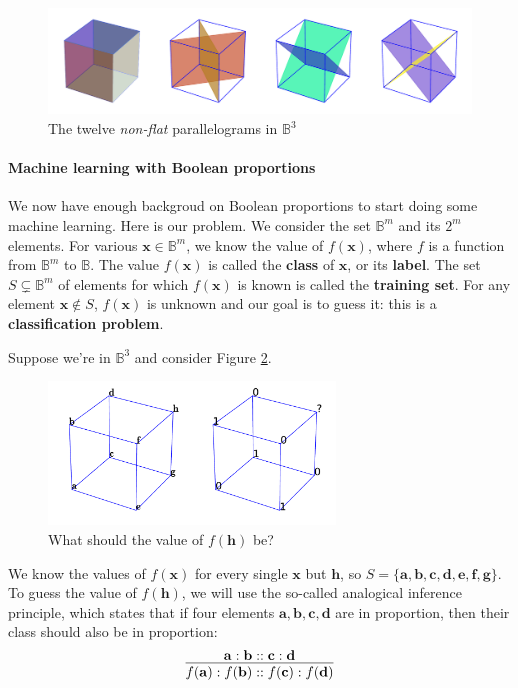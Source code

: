 \begin{figure}[!h]
\centering
\includegraphics[width=\linewidth]{figures/cubes_in_B3.pdf}
  \caption{The twelve \textit{non-flat} parallelograms in $\mathbb{B}^3$}
\label{FIG:cubes_in_B3}
\end{figure}

\paragraph{Machine learning with Boolean proportions\\}

We now have enough backgroud on Boolean proportions to start doing some machine
learning. Here is our problem. We consider the set $\mathbb{B}^m$ and its $2^m$
elements. For various $\mathbf{x} \in \mathbb{B}^m$, we know the value of
$f(\mathbf{x})$, where $f$ is a function from $\mathbb{B}^m$ to $\mathbb{B}$.
The value $f(\mathbf{x})$ is called the \textbf{class} of $\mathbf{x}$, or its
\textbf{label}. The set $S \subsetneq \mathbb{B}^m$ of elements for which
$f(\mathbf{x})$ is known is called the \textbf{training set}. For any element
$\mathbf{x} \notin S$, $f(\mathbf{x})$ is unknown and our goal is to guess it:
this is a \textbf{classification problem}.

Suppose we're in $\mathbb{B}^3$ and consider Figure
\ref{FIG:classification_problem}.
\begin{figure}[!h]
\centering
  \includegraphics[width=3in]{figures/classification_problem.pdf}
  \caption{What should the value of $f(\mathbf{h})$ be?}
\label{FIG:classification_problem}
\end{figure}
We know the values of $f(\mathbf{x})$ for
every single $\mathbf{x}$ but $\mathbf{h}$, so $S = \{ \mathbf{a}, \mathbf{b},
\mathbf{c}, \mathbf{d}, \mathbf{e}, \mathbf{f}, \mathbf{g}\}$. To guess the value of
$f(\mathbf{h})$, we will use the so-called analogical inference principle,
which states that if four elements $\mathbf{a}, \mathbf{b}, \mathbf{c},
\mathbf{d}$ are in proportion, then their class should also be in proportion:
$$
\infer{f(\mathbf{a}) : f(\mathbf{b}) :: f(\mathbf{c})
: f(\mathbf{d})}{\mathbf{a} : \mathbf{b} :: \mathbf{c} : \mathbf{d}}
$$

